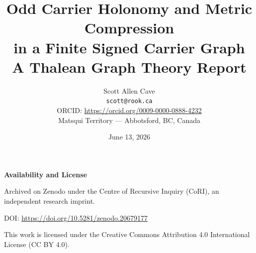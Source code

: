 \documentclass[11pt]{article}
\title{Odd Carrier Holonomy and Metric Compression\\
in a Finite Signed Carrier Graph\\[0.5em]
\large A Thalean Graph Theory Report}
\author{Scott Allen Cave\\
\texttt{scott@rook.ca}\\
ORCID: \url{https://orcid.org/0009-0000-0888-4232}\\
Matsqui Territory --- Abbotsford, BC, Canada}
\date{June 13, 2026}
\begin{document}
\maketitle

\begin{center}
\textbf{Availability and License}

Archived on Zenodo under the Centre of Recursive Inquiry (CoRI), an independent research imprint.

DOI: \url{https://doi.org/10.5281/zenodo.20679177}

This work is licensed under the Creative Commons Attribution 4.0 International License (CC BY 4.0).
\end{center}

\vspace{1em}













\end{document}
